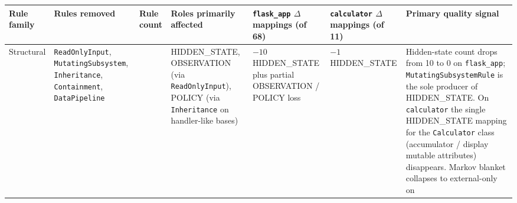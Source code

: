 \documentclass[
]{article}
\newcounter{none} %
\begin{document}
{\def\LTcaptype{none} %
\begin{longtable}[]{@{}
  >{\raggedright\arraybackslash}p{}
  >{\raggedright\arraybackslash}p{}
  >{\raggedleft\arraybackslash}p{}
  >{\raggedright\arraybackslash}p{}
  >{\centering\arraybackslash}p{}
  >{\centering\arraybackslash}p{}
  >{\raggedright\arraybackslash}p{}@{}}
\toprule\noalign{}
\begin{minipage}[b]{\linewidth}\raggedright
Rule family
\end{minipage} & \begin{minipage}[b]{\linewidth}\raggedright
Rules removed
\end{minipage} & \begin{minipage}[b]{\linewidth}\raggedleft
Rule count
\end{minipage} & \begin{minipage}[b]{\linewidth}\raggedright
Roles primarily affected
\end{minipage} & \begin{minipage}[b]{\linewidth}\centering
\texttt{flask\_app} \(\Delta\) mappings (of 68)
\end{minipage} & \begin{minipage}[b]{\linewidth}\centering
\texttt{calculator} \(\Delta\) mappings (of 11)
\end{minipage} & \begin{minipage}[b]{\linewidth}\raggedright
Primary quality signal
\end{minipage} \\
\midrule\noalign{}
\endhead
\bottomrule\noalign{}
\endlastfoot
Structural & \texttt{ReadOnlyInput}, \texttt{MutatingSubsystem},
\texttt{Inheritance}, \texttt{Containment}, \texttt{DataPipeline} & 5 &
HIDDEN\_STATE, OBSERVATION (via \texttt{ReadOnlyInput}), POLICY (via
\texttt{Inheritance} on handler-like bases) & \(-10\) HIDDEN\_STATE plus
partial OBSERVATION / POLICY loss & \(-1\) HIDDEN\_STATE & Hidden-state
count drops from 10 to 0 on \texttt{flask\_app};
\texttt{MutatingSubsystemRule} is the sole producer of HIDDEN\_STATE. On
\texttt{calculator} the single HIDDEN\_STATE mapping for the
\texttt{Calculator} class (accumulator / display mutable attributes)
disappears. Markov blanket collapses to external-only on

\end{longtable}}
\end{document}
